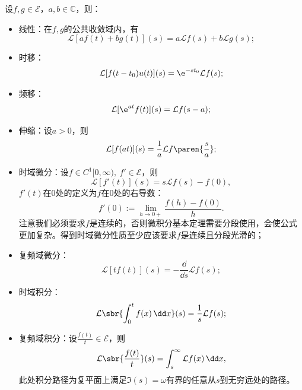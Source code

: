 \begin{proposition}[拉普拉斯变换的性质]
    设$f,g\in\mathcal{E}$，$a,b\in\mathbb{C}$，则：
    \begin{itemize}
        \item 线性：在$f,g$的公共收敛域内，有
        \begin{equation}
            \mathcal{L}[af(t)+bg(t)](s)=a\mathcal{L}f(s)+b\mathcal{L}g(s);
        \end{equation}
        \item 时移：
        \begin{equation}
            \mathcal{L}[f(t-t_0)u(t)](s)=\e^{-st_0}\mathcal{L}f(s);
        \end{equation}
        \item 频移：
        \begin{equation}
            \mathcal{L}[\e^{at}f(t)](s)=\mathcal{L}f(s-a);
        \end{equation}
        \item 伸缩：设$a>0$，则
        \begin{equation}
            \mathcal{L}[f(at)](s)=\frac{1}{a}\mathcal{L}f\paren{\frac{s}{a}};
        \end{equation}
        \item 时域微分：设$f\in C^1[0,\infty),\ f'\in\mathcal{E}$，则
        \begin{equation}
            \mathcal{L}[f'(t)](s)=s\mathcal{L}f(s)-f(0),
        \end{equation}
        $f'(t)$在$0$处的定义为$f$在$0$处的右导数：
        \begin{equation}
            f'(0):=\lim_{h\to 0+}\frac{f(h)-f(0)}{h}.
        \end{equation}
        注意我们必须要求$f$是连续的，否则微积分基本定理需要分段使用，会使公式更加复杂。得到时域微分性质至少应该要求$f$是连续且分段光滑的；
        \item 复频域微分：
        \begin{equation}
            \mathcal{L}[tf(t)](s)=-\frac{\dd}{\dd s}\mathcal{L}f(s);
        \end{equation}
        \item 时域积分：
        \begin{equation}
            \mathcal{L}\sbr{\int_0^t f(x)\,\dd x}(s)=\frac{1}{s}\mathcal{L}f(s);
        \end{equation}
        \item 复频域积分：设$\displaystyle\frac{f(t)}{t}\in\mathcal{E}$，则
        \begin{equation}
            \mathcal{L}\sbr{\frac{f(t)}{t}}(s)=\int_s^{\infty}\mathcal{L}f(x)\,\dd x,
        \end{equation}
        此处积分路径为复平面上满足$\Im(s)=\omega$有界的任意从$s$到无穷远处的路径。
    \end{itemize}
\end{proposition}
